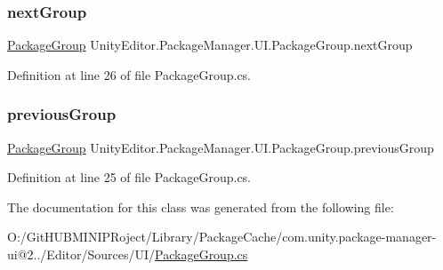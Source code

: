\subsubsection{\texorpdfstring{nextGroup}{nextGroup}}
{\footnotesize\ttfamily \mbox{\hyperlink{class_unity_editor_1_1_package_manager_1_1_u_i_1_1_package_group}{Package\+Group}} Unity\+Editor.\+Package\+Manager.\+U\+I.\+Package\+Group.\+next\+Group}



Definition at line 26 of file Package\+Group.\+cs.

\mbox{\label{class_unity_editor_1_1_package_manager_1_1_u_i_1_1_package_group_a17673340659d03fe29324de988ebc2d6}} 
\subsubsection{\texorpdfstring{previousGroup}{previousGroup}}
{\footnotesize\ttfamily \mbox{\hyperlink{class_unity_editor_1_1_package_manager_1_1_u_i_1_1_package_group}{Package\+Group}} Unity\+Editor.\+Package\+Manager.\+U\+I.\+Package\+Group.\+previous\+Group}



Definition at line 25 of file Package\+Group.\+cs.



The documentation for this class was generated from the following file\+:\begin{DoxyCompactItemize}
\item 
O\+:/\+Git\+H\+U\+B\+M\+I\+N\+I\+P\+Roject/\+Library/\+Package\+Cache/com.\+unity.\+package-\/manager-\/ui@2../\+Editor/\+Sources/\+U\+I/\mbox{\hyperlink{_package_group_8cs}{Package\+Group.\+cs}}\end{DoxyCompactItemize}
